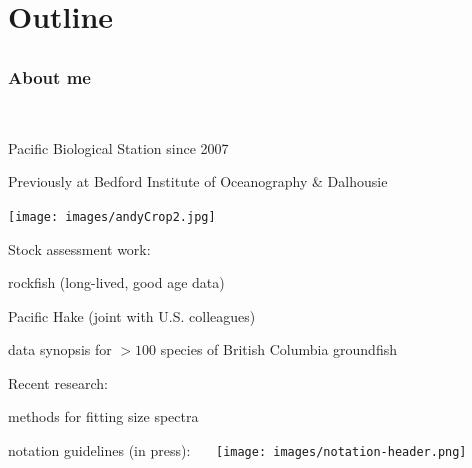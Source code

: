 \section{Outline}
\subsection{}



\begin{frame}
\frametitle{About me}
~\\

\begin{minipage}{12cm}
\bi
  \item Pacific Biological Station since 2007
  \item Previously at Bedford Institute of Oceanography \& Dalhousie
\ei
\end{minipage}
\begin{minipage}{2cm}
  \texttt{[image: images/andyCrop2.jpg]}
\end{minipage}

\bi
  \item Stock assessment work:
    \bi
    \item rockfish (long-lived, good age data)
    \item Pacific Hake (joint with U.S. colleagues)
    \item data synopsis for $>100$ species of British Columbia groundfish
  \ei
  \item Recent research:
  \bi
    \item methods for fitting size spectra
    \item notation guidelines (in press):
  \ei
\ei
\medskip
\pause
~~~\texttt{[image: images/notation-header.png]}
\end{frame}

